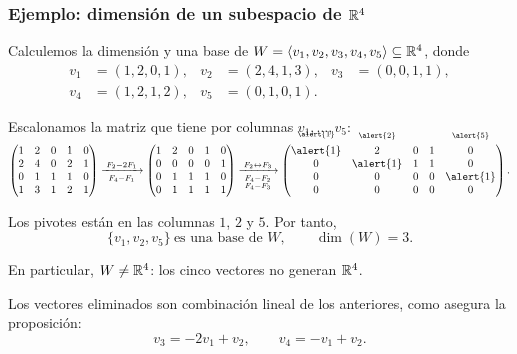 \begin{frame}[allowframebreaks, t]
    \frametitle{Ejemplo: dimensión de un subespacio de $\mathbb{R}^4$}

    \begin{example}
        Calculemos la dimensión y una base de
        $W=\langle v_1,v_2,v_3,v_4,v_5\rangle\subseteq\mathbb{R}^4$, donde
        \[
            \begin{aligned}
                v_1&=(1,2,0,1), & v_2&=(2,4,1,3), & v_3&=(0,0,1,1),\\
                v_4&=(1,2,1,2), & v_5&=(0,1,0,1).
            \end{aligned}
        \]
    \end{example}

    Escalonamos la matriz que tiene por columnas $v_1,\ldots,v_5$:
    \[
        \begin{pmatrix}
            1&2&0&1&0\\
            2&4&0&2&1\\
            0&1&1&1&0\\
            1&3&1&2&1
        \end{pmatrix}
        \xrightarrow[\;F_4-F_1\;]{\;F_2-2F_1\;}
        \begin{pmatrix}
            1&2&0&1&0\\
            0&0&0&0&1\\
            0&1&1&1&0\\
            0&1&1&1&1
        \end{pmatrix}
        \xrightarrow[\substack{F_4-F_2\\ F_4-F_3}]{\;F_2\leftrightarrow F_3\;}
        \begin{pmatrix}
            \smash{\overset{\raisebox{1.5ex}{$\scriptstyle\alert{1}$}}{\alert{1}}}&\smash{\overset{\raisebox{1.5ex}{$\scriptstyle\alert{2}$}}{2}}&0&1&\smash{\overset{\raisebox{1.5ex}{$\scriptstyle\alert{5}$}}{0}}\\
            0&\alert{1}&1&1&0\\
            0&0&0&0&\alert{1}\\
            0&0&0&0&0
        \end{pmatrix}.
    \]

    \framebreak

    Los pivotes están en las columnas $1$, $2$ y $5$. Por tanto,
    \[
        \{v_1,v_2,v_5\}\ \text{es una base de }W,
        \qquad
        \dim(W)=3.
    \]

    \medskip

    En particular, $W\neq\mathbb{R}^4$: los cinco vectores \alert{no} generan
    $\mathbb{R}^4$.

    \medskip

    Los vectores eliminados son combinación lineal de los anteriores, como
    asegura la proposición:
    \[
        v_3=-2v_1+v_2,
        \qquad
        v_4=-v_1+v_2.
    \]
\end{frame}

